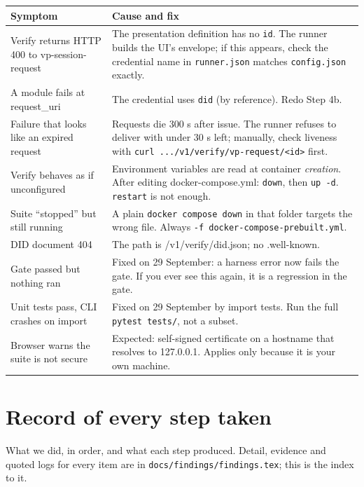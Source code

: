 \documentclass[10pt,a4paper]{article}
\newcommand{\us}{\_}
\begin{document}
\begin{longtable}{@{}p{5.4cm}p{11cm}@{}}
\toprule
Symptom & Cause and fix\\
\midrule
\endhead
Verify returns HTTP 400 to vp-session-request & The presentation definition has no
\texttt{id}. The runner builds the UI's envelope; if this appears, check the credential
name in \texttt{runner.json} matches \texttt{config.json} exactly.\\
A module fails at request\us{}uri & The credential uses \texttt{did} (by reference). Redo
Step 4b.\\
Failure that looks like an expired request & Requests die 300 s after issue. The runner
refuses to deliver with under 30 s left; manually, check liveness with
\texttt{curl .../v1/verify/vp-request/<id>} first.\\
Verify behaves as if unconfigured & Environment variables are read at container
\emph{creation}. After editing docker-compose.yml: \texttt{down}, then \texttt{up -d}.
\texttt{restart} is not enough.\\
Suite ``stopped'' but still running & A plain \texttt{docker compose down} in that folder
targets the wrong file. Always \texttt{-f docker-compose-prebuilt.yml}.\\
DID document 404 & The path is /v1/verify/did.json; no .well-known.\\
Gate passed but nothing ran & Fixed on 29 September: a harness error now fails the gate.
If you ever see this again, it is a regression in the gate.\\
Unit tests pass, CLI crashes on import & Fixed on 29 September by import tests. Run the
full \texttt{pytest tests/}, not a subset.\\
Browser warns the suite is not secure & Expected: self-signed certificate on a hostname
that resolves to 127.0.0.1. Applies only because it is your own machine.\\
\bottomrule
\end{longtable}

\newpage
\section{Record of every step taken}

What we did, in order, and what each step produced. Detail, evidence and quoted logs for
every item are in \texttt{docs/findings/findings.tex}; this is the index to it.
\end{document}
